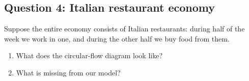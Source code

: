\documentclass[12pt]{article}
\begin{document}
\subsection*{Question 4: Italian restaurant economy}
Suppose the entire economy consists of Italian restaurants: during half of the week we work in one, and during the other half we buy food from them.
\begin{enumerate}
    \item What does the circular-flow diagram look like?
    \item What is missing from our model?
\end{enumerate}
\end{document}
